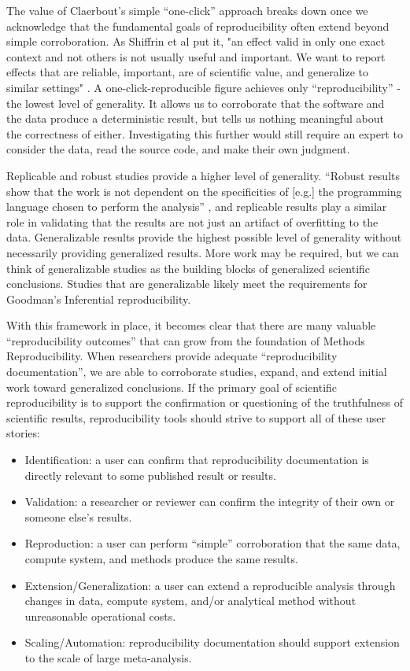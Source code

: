The value of Claerbout’s simple “one-click” approach breaks down once we
acknowledge that the fundamental goals of reproducibility often extend beyond
simple corroboration. As Shiffrin et al put it, "an effect valid in only one
exact context and not others is not usually useful and important. We want to
report effects that are reliable, important, are of scientific value, and
generalize to similar settings" \parencite[2633]{shiffrin_scientific_2018}.
A one-click-reproducible figure achieves only “reproducibility” - the lowest
level of generality. It allows us to corroborate that the software and the data
produce a deterministic result, but tells us nothing meaningful about the
correctness of either. Investigating this further would still require an expert
to consider the data, read the source code, and make their own judgment.

Replicable and robust studies provide a higher level of generality. “Robust
results show that the work is not dependent on the specificities of [e.g.] the
programming language chosen to perform the analysis”
\parencite{community_definitions_2021}, and replicable results
play a similar role in validating that the results are not just an artifact of
overfitting to the data. Generalizable results provide the highest possible
level of generality without necessarily providing generalized results. More work
may be required, but we can think of generalizable studies as the building
blocks of generalized scientific conclusions. Studies that are generalizable
likely meet the requirements for Goodman’s Inferential reproducibility.

With this framework in place, it becomes clear that there are many valuable
“reproducibility outcomes” that can grow from the foundation of Methods
Reproducibility. When researchers provide adequate “reproducibility
documentation”, we are able to corroborate studies, expand, and extend initial
work toward generalized conclusions. If the primary goal of scientific
reproducibility is to support the confirmation or questioning of the
truthfulness of scientific results, reproducibility tools should strive to
support all of these user stories:
\begin{itemize}
    \item Identification: a user can confirm that reproducibility documentation
        is directly relevant to some published result or results.
    \item Validation: a researcher or reviewer can confirm the integrity of
        their own or someone else’s results.
    \item Reproduction: a user can perform “simple” corroboration that the same
        data, compute system, and methods produce the same results.
    \item Extension/Generalization: a user can extend a reproducible analysis
        through changes in data, compute system, and/or analytical method without
        unreasonable operational costs.
    \item Scaling/Automation: reproducibility documentation should support
        extension to the scale of large meta-analysis.
\end{itemize}

